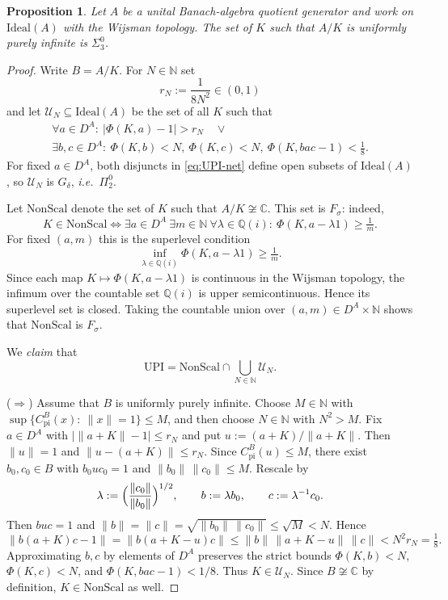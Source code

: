 \documentclass[12pt,fleqn,a4paper]{amsart}
\renewcommand{\le}{\leqslant}
\renewcommand{\ge}{\geqslant}
\numberwithin{equation}{section}
\newtheorem{proposition}[theorem]{Proposition}
\theoremstyle{definition}
\newcommand{\N}{\mathbb{N}}
\newcommand{\Q}{\mathbb{Q}}
\newcommand{\C}{\mathbb{C}}
\newcommand{\Ideal}{\mathrm{Ideal}}
\begin{document}
\begin{proposition}\label{prop:UPI}
Let $A$ be a unital Banach-algebra quotient generator and work on $\Ideal(A)$ with
the Wijsman topology.  The set of $K$ such that $A/K$ is uniformly purely infinite
is $\Sigma^0_3$.
\end{proposition}

\begin{proof}
Write $B=A/K$.  For $N\in\N$ set
\[
r_N:=\frac{1}{8N^2}\in(0,1)
\]
and let $\mathcal U_N\subseteq\Ideal(A)$ be the set of all $K$ such that
\begin{multline}\label{eq:UPI-net}
\forall a\in D^A:\ 
\bigl|\Phi(K,a)-1\bigr|>r_N
\quad\lor\\
\exists b,c\in D^A:\ 
\Phi(K,b)<N,\ \Phi(K,c)<N,\ \Phi(K,bac-1)<\tfrac18.
\end{multline}
For fixed $a\in D^A$, both disjuncts in \eqref{eq:UPI-net} define open subsets of
$\Ideal(A)$, so $\mathcal U_N$ is $G_\delta$, \emph{i.e.}\ $\Pi^0_2$.

Let $\mathrm{NonScal}$ denote the set of $K$ such that $A/K\not\cong\C$.
This set is $F_\sigma$: indeed,
\[
K\in\mathrm{NonScal}
\iff
\exists a\in D^A\ \exists m\in\N\ \forall \lambda\in\Q(i):\ \Phi(K,a-\lambda 1)\ge \tfrac1m.
\]
For fixed $(a,m)$ this is the superlevel condition
\[
\inf_{\lambda\in\Q(i)} \Phi(K,a-\lambda 1)\ge \tfrac1m.
\]
Since each map $K\mapsto \Phi(K,a-\lambda 1)$ is continuous in the Wijsman topology,
the infimum over the countable set $\Q(i)$ is upper semicontinuous.  Hence its
superlevel set is closed.  Taking the countable union over $(a,m)\in D^A\times\N$
shows that $\mathrm{NonScal}$ is $F_\sigma$.

We \emph{claim} that
\[
\mathrm{UPI}=\mathrm{NonScal}\cap\bigcup_{N\in\N}\mathcal U_N.
\]

\smallskip\noindent
($\Rightarrow$)
Assume that $B$ is uniformly purely infinite.
Choose $M\in\N$ with
$\sup\{C_{\mathrm{pi}}^B(x):\ \|x\|=1\}\le M$,
and then choose $N\in\N$ with $N^2>M$.
Fix $a\in D^A$ with $|\|a+K\|-1|\le r_N$ and put
$u:=(a+K)/\|a+K\|$.
Then $\|u\|=1$ and $\|u-(a+K)\|\le r_N$.
Since $C_{\mathrm{pi}}^B(u)\le M$, there exist $b_0,c_0\in B$ with $b_0uc_0=1$ and
$\|b_0\|\,\|c_0\|\le M$.
Rescale by
\[
\lambda:=\Bigl(\frac{\|c_0\|}{\|b_0\|}\Bigr)^{1/2},
\qquad
b:=\lambda b_0,
\qquad
c:=\lambda^{-1}c_0.
\]
Then $buc=1$ and
$\|b\|=\|c\|=\sqrt{\|b_0\|\,\|c_0\|}\le \sqrt M < N$.
Hence
\[
\|b(a+K)c-1\|
=\|b(a+K-u)c\|
\le \|b\|\,\|a+K-u\|\,\|c\|
< N^2 r_N
=\tfrac18.
\]
Approximating $b,c$ by elements of $D^A$ preserves the strict bounds
$\Phi(K,b)<N$, $\Phi(K,c)<N$, and $\Phi(K,bac-1)<1/8$.
Thus $K\in\mathcal U_N$.
Since $B\not\cong\C$ by definition, $K\in\mathrm{NonScal}$ as well.


\end{proof}
\end{document}
